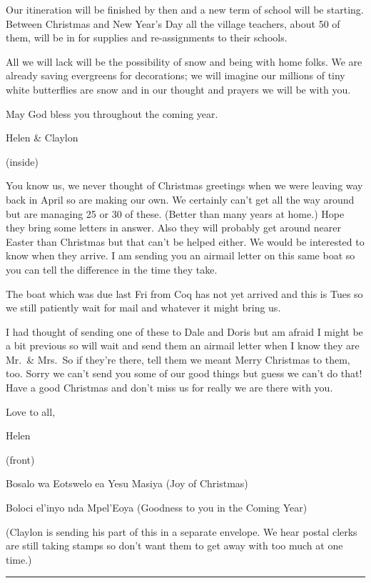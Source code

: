 \documentclass[
]{book}
\begin{document}
Our itineration will be finished by then and a new term of school will be starting. Between Christmas and New Year's Day all the village teachers, about 50 of them, will be in for supplies and re-assignments to their schools.

All we will lack will be the possibility of snow and being with home folks. We are already saving evergreens for decorations; we will imagine our millions of tiny white butterflies are snow and in our thought and prayers we will be with you.

May God bless you throughout the coming year.

Helen \& Claylon

(inside)

You know us, we never thought of Christmas greetings when we were leaving way back in April so are making our own. We certainly can't get all the way around but are managing 25 or 30 of these. (Better than many years at home.) Hope they bring some letters in answer. Also they will probably get around nearer Easter than Christmas but that can't be helped either. We would be interested to know when they arrive. I am sending you an airmail letter on this same boat so you can tell the difference in the time they take.

The boat which was due last Fri from Coq has not yet arrived and this is Tues so we still patiently wait for mail and whatever it might bring us.

I had thought of sending one of these to Dale and Doris but am afraid I might be a bit previous so will wait and send them an airmail letter when I know they are Mr.~\& Mrs.~So if they're there, tell them we meant Merry Christmas to them, too. Sorry we can't send you some of our good things but guess we can't do that! Have a good Christmas and don't miss us for really we are there with you.

Love to all,

Helen

(front)

Bosalo wa Eotswelo ea Yesu Masiya (Joy of Christmas)

Boloci el'inyo nda Mpel'Eoya (Goodness to you in the Coming Year)

(Claylon is sending his part of this in a separate envelope. We hear postal clerks are still taking stamps so don't want them to get away with too much at one time.)

\begin{center}\rule{0.5\linewidth}{0.5pt}\end{center}
\end{document}
